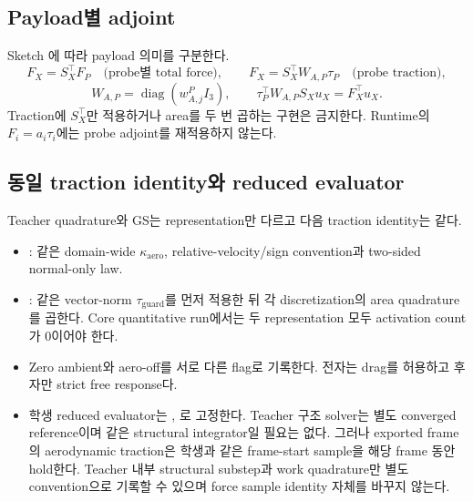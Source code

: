 \documentclass[10pt]{article}
\begin{document}
\subsection{Payload별 adjoint}
\label{sec:r1-adjoint}

Sketch 에 따라 payload 의미를 구분한다.
\[
  F_X=S_X^\top F_P \quad\text{(probe별 total force)},
  \qquad
  F_X=S_X^\top W_{A,P}\tau_P \quad\text{(probe traction)},
\]
\[
  W_{A,P}=\operatorname{diag}(w_{A,j}^PI_3),\qquad
  \tau_P^\top W_{A,P}S_Xu_X=F_X^\top u_X.
\]
Traction에 \(S_X^\top\)만 적용하거나 area를 두 번 곱하는 구현은 금지한다.
Runtime의 \(F_i=a_i\tau_i\)에는 probe adjoint를 재적용하지 않는다.

\subsection{동일 traction identity와 reduced evaluator}

Teacher quadrature와 GS는 representation만 다르고 다음 traction identity는 같다.
\begin{itemize}
  \item {}: 같은
  domain-wide \(\kappa_{\mathrm{aero}}\), relative-velocity/sign convention과 two-sided normal-only law.
  \item {}: 같은 vector-norm
  \(\tau_{\mathrm{guard}}\)를 먼저 적용한 뒤 각 discretization의 area quadrature를 곱한다.
  Core quantitative run에서는 두 representation 모두 activation count가 0이어야 한다.
  \item Zero ambient와 aero-off를 서로 다른 flag로 기록한다. 전자는 drag를 허용하고 후자만 strict free response다.
  \item 학생 reduced evaluator는 ,
  로 고정한다. Teacher 구조 solver는 별도 converged reference이며
  같은 structural integrator일 필요는 없다. 그러나 exported frame의 aerodynamic traction은 학생과 같은
  frame-start sample을 해당 frame 동안 hold한다. Teacher 내부 structural substep과 work quadrature만 별도
  convention으로 기록할 수 있으며 force sample identity 자체를 바꾸지 않는다.
\end{itemize}
\end{document}
